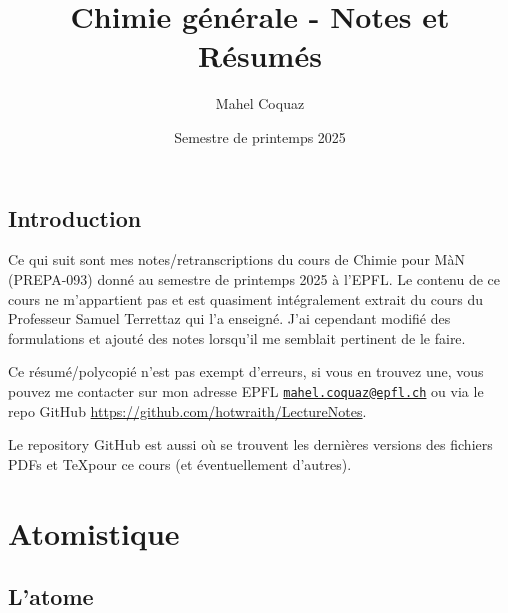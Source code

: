 \documentclass[10pt,a4paper]{book}
\title{Chimie générale \vspace{0.2cm} - Notes et Résumés}
\author{Mahel Coquaz}
\date{Semestre de printemps 2025}
\begin{document}
\maketitle
\tableofcontents
\newpage
\section*{Introduction}
Ce qui suit sont mes notes/retranscriptions du cours de Chimie pour MàN (PREPA-093) donné au semestre de printemps 2025 à l'EPFL. Le contenu de ce cours ne m'appartient pas et est quasiment intégralement extrait du cours du Professeur Samuel Terrettaz qui l'a enseigné. J'ai cependant modifié des formulations et ajouté des notes lorsqu'il me semblait pertinent de le faire. \par
Ce résumé/polycopié n'est pas exempt d'erreurs, si vous en trouvez une, vous pouvez me contacter sur mon adresse EPFL \texttt{\href{mailto:mahel.coquaz@epfl.ch}{mahel.coquaz@epfl.ch}} ou via le repo GitHub \url{https://github.com/hotwraith/LectureNotes}. \par
Le repository GitHub est aussi où se trouvent les dernières versions des fichiers PDFs et \TeX pour ce cours (et éventuellement d'autres).

\chapter{Atomistique}

\section{L'atome}
\end{document}
